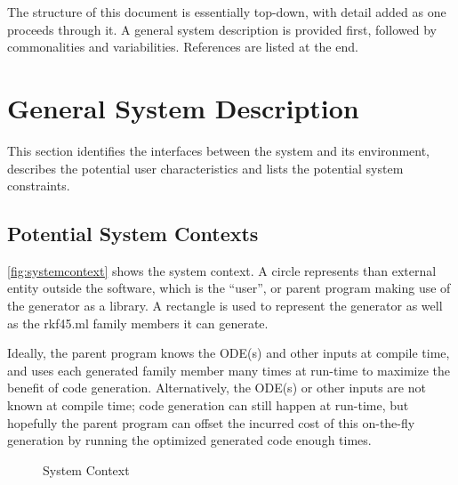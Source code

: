 \documentclass[12pt]{article}
\newcommand{\famname}{rkf45.ml} %
\begin{document}
The structure of this document is essentially top-down, with detail added as 
one proceeds through it. A general system description is provided first, 
followed by commonalities and variabilities. References are listed at the end.

\section{General System Description}

This section identifies the interfaces between the system and its environment,
describes the potential user characteristics and lists the potential system
constraints.

\subsection{Potential System Contexts}

\autoref{fig:systemcontext} shows the system context. A circle represents than 
external entity outside the software, which is the ``user'', or parent program 
making use of the generator as a library. A rectangle is used to represent the 
generator as well as the \famname{} family members it can generate. 

Ideally, 
the parent program knows the ODE(s) and other inputs at compile time, and
uses each generated family member many times at run-time to maximize the 
benefit of code generation. 
Alternatively, the ODE(s) or other inputs are 
not known at compile time; code generation can still happen at run-time, but 
hopefully the parent program can offset the incurred cost of this on-the-fly 
generation by running the optimized generated code enough times.

\begin{figure}[ht]
    \centering
{}
\caption{System Context}
\label{fig:systemcontext}
\end{figure}
\end{document}
